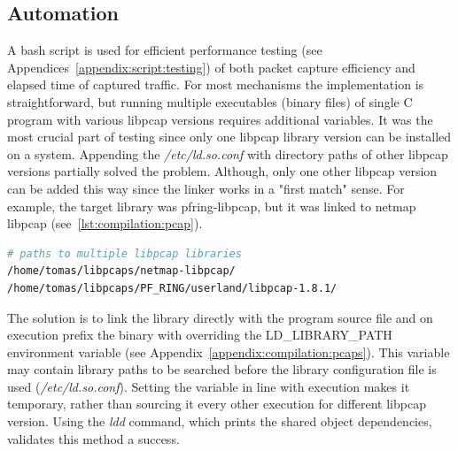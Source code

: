 \documentclass[12pt,a4paper,twoside]{book}
\begin{document}
        \subsection{Automation} \label{analysis:testing:auto}
            A bash script is used for efficient performance testing (see Appendices~\ref{appendix:script:testing}) of both packet capture efficiency and elapsed time of captured traffic. For most mechanisms the implementation is straightforward, but running multiple executables (binary files) of single C program with various libpcap versions requires additional variables. It was the most crucial part of testing since only one libpcap library version can be installed on a system. Appending the \emph{/etc/ld.so.conf} with directory paths of other libpcap versions partially solved the problem. Although, only one other libpcap version can be added this way since the linker works in a "first match" sense. For example, the target library was pfring-libpcap, but it was linked to netmap libpcap (see~\autoref{lst:compilation:pcap}).
            \begin{lstlisting}[language=bash, caption=Contents of /etc/ld.so.conf.d/libpcaps.conf., label=lst:compilation:pcap]
# paths to multiple libpcap libraries
/home/tomas/libpcaps/netmap-libpcap/
/home/tomas/libpcaps/PF_RING/userland/libpcap-1.8.1/
            \end{lstlisting}
            \par
            The solution is to link the library directly with the program source file and on execution prefix the binary with overriding the LD\_LIBRARY\_PATH \cite{web:libraries:ldpath} environment variable (see Appendix~\ref{appendix:compilation:pcaps}). This variable may contain library paths to be searched before the library configuration file is used (\emph{/etc/ld.so.conf}). Setting the variable in line with execution makes it temporary, rather than sourcing it every other execution for different libpcap version. Using the \emph{ldd} command, which prints the shared object dependencies, validates this method a success.
\end{document}

